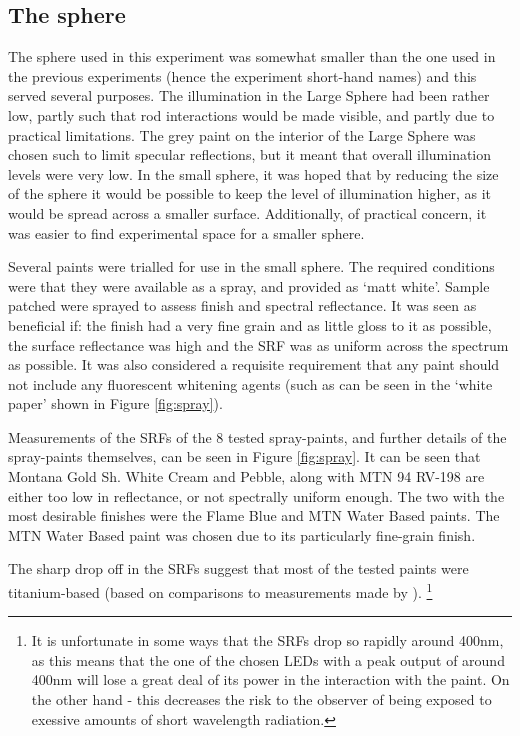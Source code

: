 \subsection{The sphere}



The sphere used in this experiment was somewhat smaller than the one used in the previous experiments (hence the experiment short-hand names) and this served several purposes. The illumination in the Large Sphere had been rather low, partly such that rod interactions would be made visible, and partly due to practical limitations. The grey paint on the interior of the Large Sphere was chosen such to limit specular reflections, but it meant that overall illumination levels were very low. In the small sphere, it was hoped that by reducing the size of the sphere it would be possible to keep the level of illumination higher, as it would be spread across a smaller surface. Additionally, of practical concern, it was easier to find experimental space for a smaller sphere.

Several paints were trialled for use in the small sphere. The required conditions were that they were available as a spray, and provided as `matt white'. Sample patched were sprayed to assess finish and spectral reflectance. It was seen as beneficial if: the finish had a very fine grain and as little gloss to it as possible, the surface reflectance was high and the \gls{SRF} was as uniform across the spectrum as possible. It was also considered a requisite requirement that any paint should not include any fluorescent whitening agents (such as can be seen in the `white paper' shown in Figure \ref{fig:spray}).

Measurements of the \glspl{SRF} of the 8 tested spray-paints, and further details of the spray-paints themselves, can be seen in Figure \ref{fig:spray}. It can be seen that Montana Gold Sh. White Cream and Pebble, along with MTN 94 RV-198 are either too low in reflectance, or not spectrally uniform enough. The two with the most desirable finishes were the Flame Blue and MTN Water Based paints. The MTN Water Based paint was chosen due to its particularly fine-grain finish.

The sharp drop off in the \glspl{SRF} suggest that most of the tested paints were titanium-based (based on comparisons to measurements made by \citet{cosentino_fors_2014}). \footnote{It is unfortunate in some ways that the \glspl{SRF} drop so rapidly around 400nm, as this means that the one of the chosen LEDs with a peak output of around 400nm will lose a great deal of its power in the interaction with the paint. On the other hand - this decreases the risk to the observer of being exposed to exessive amounts of short wavelength radiation.}  

